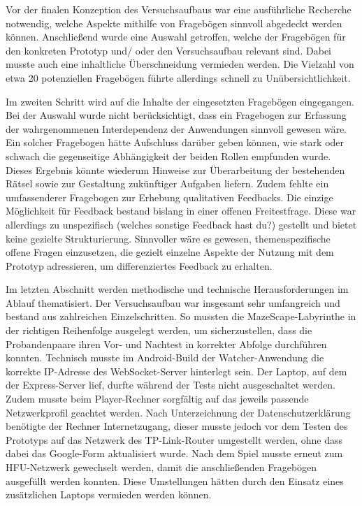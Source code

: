 Vor der finalen Konzeption des Versuchsaufbaus war eine ausführliche Recherche notwendig, welche Aspekte mithilfe von Fragebögen sinnvoll abgedeckt werden können. Anschließend wurde eine Auswahl getroffen, welche der Fragebögen für den konkreten Prototyp und/ oder den Versuchsaufbau relevant sind. Dabei musste auch eine inhaltliche Überschneidung vermieden werden. Die Vielzahl von etwa 20 potenziellen Fragebögen führte allerdings schnell zu Unübersichtlichkeit.

Im zweiten Schritt wird auf die Inhalte der eingesetzten Fragebögen eingegangen.
Bei der Auswahl wurde nicht berücksichtigt, dass ein Fragebogen zur Erfassung der wahrgenommenen Interdependenz der Anwendungen sinnvoll gewesen wäre. Ein solcher Fragebogen hätte Aufschluss darüber geben können, wie stark oder schwach die gegenseitige Abhängigkeit der beiden Rollen empfunden wurde. Dieses Ergebnis könnte wiederum Hinweise zur Überarbeitung der bestehenden Rätsel sowie zur Gestaltung zukünftiger Aufgaben liefern.
Zudem fehlte ein umfassenderer Fragebogen zur Erhebung qualitativen Feedbacks. Die einzige Möglichkeit für Feedback bestand bislang in einer offenen Freitestfrage. Diese war allerdings zu unspezifisch (welches sonstige Feedback hast du?) gestellt und bietet keine gezielte Strukturierung. Sinnvoller wäre es gewesen, themenspezifische offene Fragen einzusetzen, die gezielt einzelne Aspekte der Nutzung mit dem Prototyp adressieren, um differenziertes Feedback zu erhalten.

Im letzten Abschnitt werden methodische und technische Herausforderungen im Ablauf thematisiert.
Der Versuchsaufbau war insgesamt sehr umfangreich und bestand aus zahlreichen Einzelschritten. So mussten die MazeScape-Labyrinthe in der richtigen Reihenfolge ausgelegt werden, um sicherzustellen, dass die Probandenpaare ihren Vor- und Nachtest in korrekter Abfolge durchführen konnten.
Technisch musste im Android-Build der Watcher-Anwendung die korrekte IP-Adresse des WebSocket-Server hinterlegt sein. Der Laptop, auf dem der Express-Server lief, durfte während der Tests nicht ausgeschaltet werden. Zudem musste beim Player-Rechner sorgfältig auf das jeweils passende Netzwerkprofil geachtet werden. Nach Unterzeichnung der Datenschutzerklärung benötigte der Rechner Internetzugang, dieser musste jedoch vor dem Testen des Prototyps auf das Netzwerk des TP-Link-Router umgestellt werden, ohne dass dabei das Google-Form aktualisiert wurde. Nach dem Spiel musste erneut zum HFU-Netzwerk gewechselt werden, damit die anschließenden Fragebögen ausgefüllt werden konnten. Diese Umstellungen hätten durch den Einsatz eines zusätzlichen Laptops vermieden werden können.

